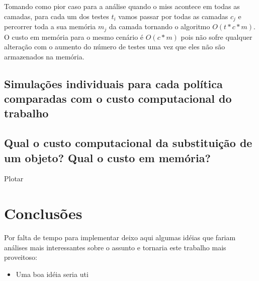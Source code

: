 \documentclass[12pt]{article}
\begin{document}
Tomando como pior caso para a análise quando o miss acontece em todas as
camadas, para cada um dos testes $t_{i}$ vamos passar por todas as camadas
$c_{j}$ e percorrer toda a sua memória $m_{j}$ da camada tornando o algoritmo
$O(t*c*m)$. O custo em memória para o mesmo cenário é $O(c*m)$ pois não sofre
qualquer alteração com o aumento do número de testes uma vez que eles não são
armazenados na memória.

\subsection{Simulações individuais para cada política comparadas com o custo
computacional do trabalho}

\subsection{Qual o custo computacional da substituição de um objeto? Qual o custo em memória?}
Plotar


\section{Conclusões}
\label{conclusao}

Por falta de tempo para implementar deixo aqui algumas idéias que fariam análises mais interessantes sobre o assunto e tornaria este trabalho mais proveitoso:
\begin{itemize}
  \item Uma boa idéia seria uti
\end{itemize}
\end{document}
